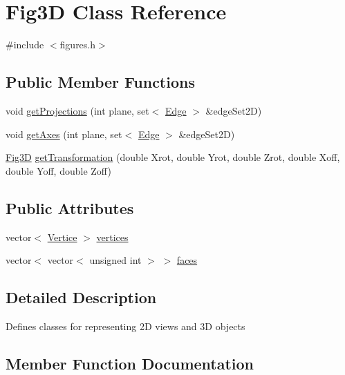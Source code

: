 \hypertarget{classFig3D}{}\section{Fig3D Class Reference}
\label{classFig3D}


{\ttfamily \#include $<$figures.\+h$>$}

\subsection*{Public Member Functions}
\begin{DoxyCompactItemize}
\item 
void \hyperlink{classFig3D_af1000067e4e230b41059896c8cacd4e1}{get\+Projections} (int plane, set$<$ \hyperlink{structEdge}{Edge} $>$ \&edge\+Set2D)
\item 
void \hyperlink{classFig3D_a4fbcfab626ef2fe938bc53dec4c0543a}{get\+Axes} (int plane, set$<$ \hyperlink{structEdge}{Edge} $>$ \&edge\+Set2D)
\item 
\hyperlink{classFig3D}{Fig3D} \hyperlink{classFig3D_a25a3607c2735064d0bc0081b271ea224}{get\+Transformation} (double Xrot, double Yrot, double Zrot, double Xoff, double Yoff, double Zoff)
\end{DoxyCompactItemize}
\subsection*{Public Attributes}
\begin{DoxyCompactItemize}
\item 
vector$<$ \hyperlink{structVertice}{Vertice} $>$ \hyperlink{classFig3D_a3d00aa545805c0c04563055cc183cbb9}{vertices}
\item 
vector$<$ vector$<$ unsigned int $>$ $>$ \hyperlink{classFig3D_abd9f97ce3404190fd202b12885d56fe3}{faces}
\end{DoxyCompactItemize}


\subsection{Detailed Description}
Defines classes for representing 2D views and 3D objects 

\subsection{Member Function Documentation}
\mbox{\label{classFig3D_a4fbcfab626ef2fe938bc53dec4c0543a}} 
